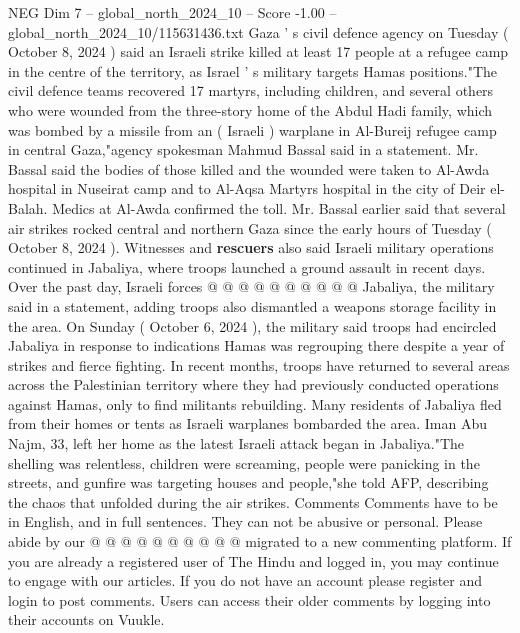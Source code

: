 \begin{textsample}{NEG Dim 7 – global\_north\_2024\_10 – Score -1.00 – global\_north\_2024\_10/115631436.txt}  \label{ex:f7_neg_361}
Gaza ' s civil defence agency on Tuesday ( October 8, 2024 ) said an Israeli strike killed at least 17 people at a refugee camp in the centre of the territory, as Israel ' s military targets Hamas positions."The civil defence teams recovered 17 martyrs, including children, and several others who were wounded from the three-story home of the Abdul Hadi family, which was bombed by a missile from an ( Israeli ) warplane in Al-Bureij refugee camp in central Gaza,"agency spokesman Mahmud Bassal said in a statement.
Mr.
Bassal said the bodies of those killed and the wounded were taken to Al-Awda hospital in Nuseirat camp and to Al-Aqsa Martyrs hospital in the city of Deir el-Balah.
Medics at Al-Awda confirmed the toll.
Mr.
Bassal earlier said that several air strikes rocked central and northern Gaza since the early hours of Tuesday ( October 8, 2024 ).
Witnesses and \textbf{rescuers} also said Israeli military operations continued in Jabaliya, where troops launched a ground assault in recent days.
Over the past day, Israeli forces @ @ @ @ @ @ @ @ @ @ Jabaliya, the military said in a statement, adding troops also dismantled a weapons storage facility in the area.
On Sunday ( October 6, 2024 ), the military said troops had encircled Jabaliya in response to indications Hamas was regrouping there despite a year of strikes and fierce fighting.
In recent months, troops have returned to several areas across the Palestinian territory where they had previously conducted operations against Hamas, only to find militants rebuilding.
Many residents of Jabaliya fled from their homes or tents as Israeli warplanes bombarded the area.
Iman Abu Najm, 33, left her home as the latest Israeli attack began in Jabaliya."The shelling was relentless, children were screaming, people were panicking in the streets, and gunfire was targeting houses and people,"she told AFP, describing the chaos that unfolded during the air strikes.
Comments Comments have to be in English, and in full sentences.
They can not be abusive or personal.
Please abide by our @ @ @ @ @ @ @ @ @ @ migrated to a new commenting platform.
If you are already a registered user of The Hindu and logged in, you may continue to engage with our articles.
If you do not have an account please register and login to post comments.
Users can access their older comments by logging into their accounts on Vuukle.

\end{textsample}
